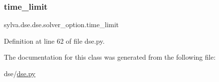 \subsubsection{\texorpdfstring{time\+\_\+limit}{time\_limit}}
{\footnotesize\ttfamily sylva.\+dse.\+dse.\+solver\+\_\+option.\+time\+\_\+limit}



Definition at line 62 of file dse.\+py.



The documentation for this class was generated from the following file\+:\begin{DoxyCompactItemize}
\item 
dse/\hyperlink{dse_8py}{dse.\+py}\end{DoxyCompactItemize}
